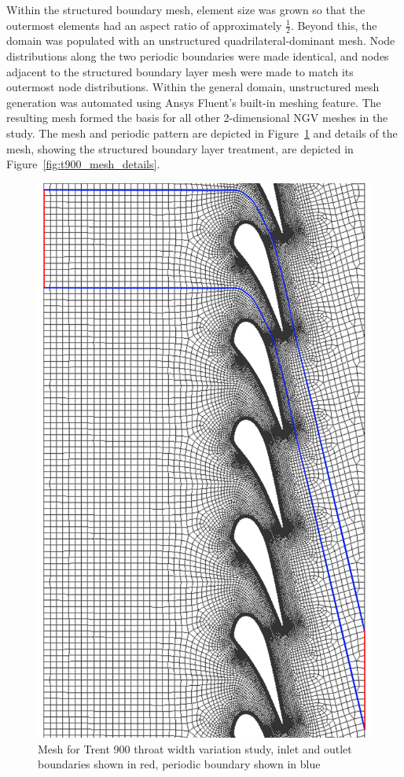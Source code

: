 \documentclass[a4paper, 11pt, oneside]{report}
\begin{document}
Within the structured boundary mesh, element size was grown so that the outermost elements had an aspect ratio of approximately $\frac{1}{2}$. Beyond this, the domain was populated with an unstructured quadrilateral-dominant mesh. Node distributions along the two periodic boundaries were made identical, and nodes adjacent to the structured boundary layer mesh were made to match its outermost node distributions. Within the general domain, unstructured mesh generation was automated using Ansys Fluent's built-in meshing feature. The resulting mesh formed the basis for all other 2-dimensional NGV meshes in the study. The mesh and periodic pattern are depicted in Figure~\ref{fig:t900_mesh_whole} and details of the mesh, showing the structured boundary layer treatment, are depicted in Figure~\ref{fig:t900_mesh_details}.

\begin{figure}[H]
      \centering
      \includegraphics[width=.85\textwidth]{figs/t900_mesh_whole.png}
      \caption{Mesh for Trent 900 throat width variation study, inlet and outlet boundaries shown in red, periodic boundary shown in blue}
      \label{fig:t900_mesh_whole}
\end{figure}
\end{document}
